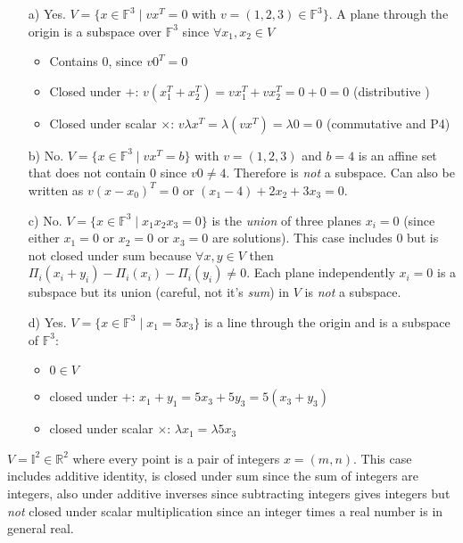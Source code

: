 \begin{enumerate}
\item[a)] Yes. $V=\{x\in\mathbb{F}^3\mid vx^T=0$ with $v=(1,2,3)\in \mathbb{F}^3 \}$. A plane through the origin is a subspace over $\mathbb{F}^3$ since $\forall x_1, x_2 \in V$
\begin{itemize}
\item Contains $0$, since $v0^T= 0$
\item Closed under $+$: $v(x_1^T + x_2^T) = vx_1^T + vx_2^T= 0+0 = 0$ (distributive )
\item Closed under scalar $\times$: $v \lambda x^T = \lambda (v x^T) = \lambda 0 = 0$  (commutative and P4)
\end{itemize}

\item[b)] No. $V=\{x\in\mathbb{F}^3\mid vx^T=b\}$ with  $v=(1,2,3)$ and $b=4$ is an affine set that does not contain $0$ since $v0\neq 4$. Therefore is \emph{not} a subspace. Can also be written as $v(x-x_0)^T = 0$ or $(x_1-4) + 2x_2 + 3x_3=0$.

\item[c)] No.  $V=\{x\in\mathbb{F}^3\mid x_1x_2x_3=0\}$ is the \emph{union} of three planes $x_i=0$ (since either $x_1=0$ or $x_2=0$ or $x_3=0$ are solutions). 
This case includes $0$ but is not closed under sum because $\forall x,y\in V$ then $\Pi_i(x_i+y_i)-\Pi_i(x_i)-\Pi_i(y_i) \neq 0$. 
Each plane independently $x_i=0$  is a subspace but its union (careful, not it's \emph{sum}) in $V$ is \emph{not} a subspace.

\item[d)]Yes. $V=\{x\in\mathbb{F}^3\mid x_1=5x_3\}$ is a line through the origin and is a subspace of $\mathbb{F}^3$:
\begin{itemize}
\item $0\in V$
\item closed under $+$: $ x_1+y_1 = 5x_3+5y_3 = 5(x_3+y_3)$
\item closed under scalar $\times$: $\lambda x_1 = \lambda 5x_3$
\end{itemize}

\end{enumerate}
\exo{}
$V = \mathbb{I}^2 \in \mathbb{R}^2$ where every point is a pair of integers $x=(m,n)$. This case includes additive identity, is closed under sum since the sum of integers are integers, also under additive inverses since subtracting integers gives integers but \emph{not} closed under scalar multiplication since an integer times a real number is in general real.

